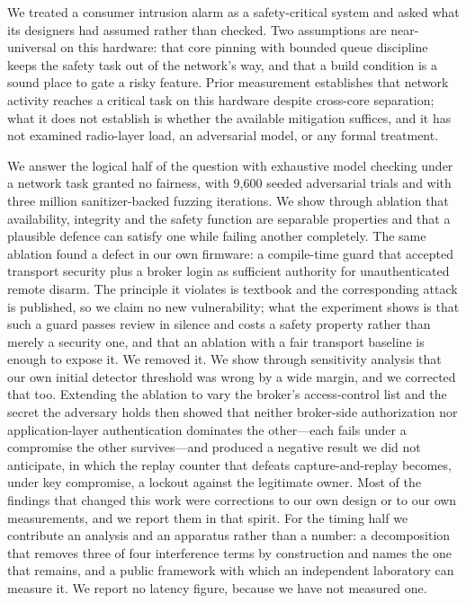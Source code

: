 We treated a consumer intrusion alarm as a safety-critical system and asked what its
designers had assumed rather than checked. Two assumptions are near-universal on this
hardware: that core pinning with bounded queue discipline keeps the safety task out of the
network's way, and that a build condition is a sound place to gate a risky feature. Prior measurement
establishes that network activity reaches a critical task on this hardware despite cross-core
separation; what it does not establish is whether the available mitigation suffices, and it has
not examined radio-layer load, an adversarial model, or any formal treatment.

We answer the logical half of the question with exhaustive model checking under a network task
granted no fairness, with 9{,}600 seeded adversarial trials and with three million
sanitizer-backed fuzzing iterations. We show through ablation that availability, integrity and
the safety function are separable properties and that a plausible defence can satisfy one while
failing another completely. The same ablation found a defect in our own firmware: a compile-time
guard that accepted transport security plus a broker login as sufficient authority for
unauthenticated remote disarm. The principle it violates is textbook and the corresponding
attack is published, so we claim no new vulnerability; what the experiment shows is that such a
guard passes review in silence and costs a safety property rather than merely a security one,
and that an ablation with a fair transport baseline is enough to expose it. We removed it. We
show through sensitivity analysis that our own initial detector threshold was wrong by a wide
margin, and we corrected that too. Extending the ablation to vary the broker's access-control
list and the secret the adversary holds then showed that neither broker-side authorization nor
application-layer authentication dominates the other---each fails under a compromise the other
survives---and produced a negative result we did not anticipate, in which the replay counter
that defeats capture-and-replay becomes, under key compromise, a lockout against the
legitimate owner. Most of the findings that changed this work were corrections to our own
design or to our own measurements, and we report them in that spirit. For the timing half we contribute an analysis
and an apparatus rather than a number: a decomposition that removes three of four interference
terms by construction and names the one that remains, and a public framework with which an
independent laboratory can measure it. We report no latency figure, because we have not
measured one.

